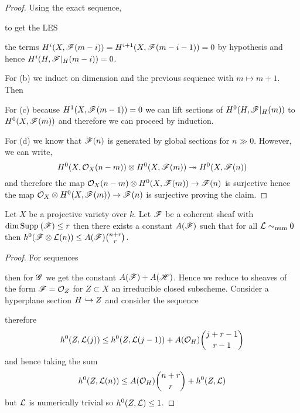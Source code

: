 \documentclass[12pt]{article}
\begin{document}
\begin{proof}
Using the exact sequence,
\begin{center}
\end{center}
to get the LES
\begin{center}
\end{center}
the terms $H^i(X, \mathscr{F}(m-i)) = H^{i+1}(X, \mathscr{F}(m-i-1)) = 0$ by hypothesis and hence $H^i(H, \mathscr{F}|_H(m-i)) = 0$.

For (b) we induct on dimension and the previous sequence with $m \mapsto m + 1$. Then 


For (c) because $H^1(X, \mathscr{F}(m-1)) = 0$ we can lift sections of $H^0(H, \mathscr{F}|_H(m))$ to $H^0(X, \mathscr{F}(m))$ and therefore we can proceed by induction. 

For (d) we know that $\mathscr{F}(n)$ is generated by global sections for $n \gg 0$. However, we can write,
\[ H^0(X, \mathcal{O}_{X}(n-m)) \otimes H^0(X, \mathscr{F}(m)) \twoheadrightarrow H^0(X, \mathscr{F}(n)) \]
and therefore the map $\mathcal{O}_{X}(n-m) \otimes H^0(X, \mathscr{F}(m)) \to \mathscr{F}(n)$ is surjective hence the map $\mathcal{O}_{X} \otimes H^0(X, \mathscr{F}(m)) \to \mathscr{F}(n)$ is surjective proving the claim.
\end{proof}

\begin{lemma}
Let $X$ be a projective variety over $k$. Let $\mathscr{F}$ be a coherent sheaf with $\dim{\mathrm{Supp}_{}\left(\mathscr{F}\right)} \le r$ then there exists a constant $A(\mathscr{F})$ such that for all $\mathcal{L} \sim_{\text{num}} 0$ then $h^0(\mathscr{F} \otimes \mathcal{L}(n)) \le A(\mathscr{F}) { n + r \choose r}$.
\end{lemma}

\begin{proof}
For sequences
\begin{center}
\end{center}
then for $\mathscr{G}$ we get the constant $A(\mathscr{F}) + A(\mathscr{H})$. Hence we reduce to sheaves of the form $\mathscr{F} = \mathcal{O}_{Z}$ for $Z \subset X$ an irreducible closed subscheme. Consider a hyperplane section $H \hookrightarrow Z$ and consider the sequence
\begin{center}
\end{center}
therefore
\[ h^0(Z, \mathcal{L}(j)) \le h^0(Z, \mathcal{L}(j-1)) + A(\mathcal{O}_{H}) { j + r - 1 \choose r - 1 } \]
and hence taking the sum
\[ h^0(Z, \mathcal{L}(n)) \le A(\mathcal{O}_{H}) { n + r \choose r } + h^0(Z, \mathcal{L}) \]
but $\mathcal{L}$ is numerically trivial so $h^0(Z, \mathcal{L}) \le 1$.
\end{proof}
\end{document}
